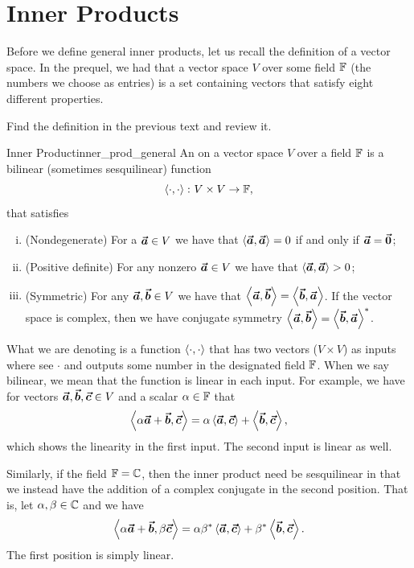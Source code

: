 \section{Inner Products}

Before we define general inner products, let us recall the definition of a vector space.  In the prequel, we had that a vector space $V$ over some field $\mathbb{F}$ (the numbers we choose as entries) is a set containing vectors that satisfy eight different properties.

\begin{exercise}
	Find the definition in the previous text and review it.
\end{exercise}

\begin{df}{Inner Product}{inner_prod_general}
An  on a vector space $V$ over a field $\mathbb{F}$ is a bilinear (sometimes sesquilinear) function
\[
\left\langle \cdot, \cdot \right\rangle \colon V \times V \to \mathbb{F},
\]
that satisfies
\begin{enumerate}[i.]
	\item (Nondegenerate) For a $\boldsymbol{\vec{a}}\in V$ we have that $\left\langle \boldsymbol{\vec{a}}, \boldsymbol{\vec{a}} \right\rangle =0$ if and only if $\boldsymbol{\vec{a}}=\boldsymbol{\vec{0}}$;
	\item (Positive definite) For any nonzero $\boldsymbol{\vec{a}} \in V$ we have that $\left\langle \boldsymbol{\vec{a}}, \boldsymbol{\vec{a}} \right\rangle > 0$;
	\item (Symmetric) For any $\boldsymbol{\vec{a}},\boldsymbol{\vec{b}}\in V$ we have that $\left\langle \boldsymbol{\vec{a}}, \boldsymbol{\vec{b}} \right\rangle = \left\langle \boldsymbol{\vec{b}}, \boldsymbol{\vec{a}} \right\rangle$. If the vector space is complex, then we have conjugate symmetry $\left\langle \boldsymbol{\vec{a}}, \boldsymbol{\vec{b}} \right\rangle=\left\langle \boldsymbol{\vec{b}}, \boldsymbol{\vec{a}} \right\rangle^*$.
\end{enumerate}
What we are denoting is a function $\left\langle \cdot, \cdot \right\rangle$ that has two vectors ($V\times V$) as inputs where see $\cdot$ and outputs some number in the designated field $\mathbb{F}$. When we say bilinear, we mean that the function is linear in each input. For example, we have for vectors $\boldsymbol{\vec{a}},\boldsymbol{\vec{b}},\boldsymbol{\vec{c}}\in V$ and a scalar $\alpha \in \mathbb{F}$ that
\[
\left\langle \alpha\boldsymbol{\vec{a}} + \boldsymbol{\vec{b}}, \boldsymbol{\vec{c}} \right\rangle = \alpha \left\langle \boldsymbol{\vec{a}}, \boldsymbol{\vec{c}} \right\rangle + \left\langle \boldsymbol{\vec{b}}, \boldsymbol{\vec{c}} \right\rangle,
\]
which shows the linearity in the first input.  The second input is linear as well.

Similarly, if the field $\mathbb{F}=\mathbb{C}$, then the inner product need be sesquilinear in that we instead have the addition of a complex conjugate in the second position. That is, let $\alpha,\beta\in \mathbb{C}$ and we have
\[
\left\langle \alpha\boldsymbol{\vec{a}} + \boldsymbol{\vec{b}}, \beta\boldsymbol{\vec{c}} \right\rangle = \alpha \beta^*\left\langle \boldsymbol{\vec{a}}, \boldsymbol{\vec{c}} \right\rangle + \beta^*\left\langle \boldsymbol{\vec{b}}, \boldsymbol{\vec{c}} \right\rangle.
\]
The first position is simply linear.
\end{df}

